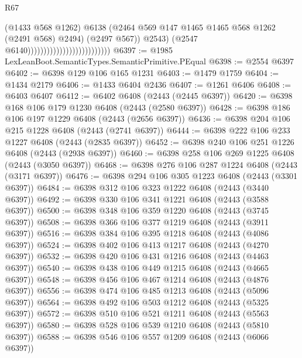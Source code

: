 \begin{lexlean}{R67}
\begin{coremodule}
                                                          (@1433 @568 @1262)
                                                          @6138
                                                          (@2464
                                                            @569
                                                            @147
                                                            @1465
                                                            @1465
                                                            @568
                                                            @1262
                                                            (@2491 @568)
                                                            @2494)
                                                          (@2497 @567))
                                                        @2543)
                                                      (@2547 @6140))))))))))))))))))))))))))
@6397 := @1985 LexLeanBoot.SemanticTypes.SemanticPrimitive.PEqual
@6398 := @2554 @6397
@6402 := @6398 @129 @106 @165 @1231
@6403 := @1479 @1759
@6404 := @1434 @2179
@6406 := @1433 @6404 @2436
@6407 := @1261 @6406
@6408 := @6403 @6407
@6412 := @6402 @6408 (@2443 (@2445 @6397))
@6420 := @6398 @168 @106 @179 @1230 @6408 (@2443 (@2580 @6397))
@6428 := @6398 @186 @106 @197 @1229 @6408 (@2443 (@2656 @6397))
@6436 := @6398 @204 @106 @215 @1228 @6408 (@2443 (@2741 @6397))
@6444 := @6398 @222 @106 @233 @1227 @6408 (@2443 (@2835 @6397))
@6452 := @6398 @240 @106 @251 @1226 @6408 (@2443 (@2938 @6397))
@6460 := @6398 @258 @106 @269 @1225 @6408 (@2443 (@3050 @6397))
@6468 := @6398 @276 @106 @287 @1224 @6408 (@2443 (@3171 @6397))
@6476 := @6398 @294 @106 @305 @1223 @6408 (@2443 (@3301 @6397))
@6484 := @6398 @312 @106 @323 @1222 @6408 (@2443 (@3440 @6397))
@6492 := @6398 @330 @106 @341 @1221 @6408 (@2443 (@3588 @6397))
@6500 := @6398 @348 @106 @359 @1220 @6408 (@2443 (@3745 @6397))
@6508 := @6398 @366 @106 @377 @1219 @6408 (@2443 (@3911 @6397))
@6516 := @6398 @384 @106 @395 @1218 @6408 (@2443 (@4086 @6397))
@6524 := @6398 @402 @106 @413 @1217 @6408 (@2443 (@4270 @6397))
@6532 := @6398 @420 @106 @431 @1216 @6408 (@2443 (@4463 @6397))
@6540 := @6398 @438 @106 @449 @1215 @6408 (@2443 (@4665 @6397))
@6548 := @6398 @456 @106 @467 @1214 @6408 (@2443 (@4876 @6397))
@6556 := @6398 @474 @106 @485 @1213 @6408 (@2443 (@5096 @6397))
@6564 := @6398 @492 @106 @503 @1212 @6408 (@2443 (@5325 @6397))
@6572 := @6398 @510 @106 @521 @1211 @6408 (@2443 (@5563 @6397))
@6580 := @6398 @528 @106 @539 @1210 @6408 (@2443 (@5810 @6397))
@6588 := @6398 @546 @106 @557 @1209 @6408 (@2443 (@6066 @6397))

\end{coremodule}
\end{lexlean}
